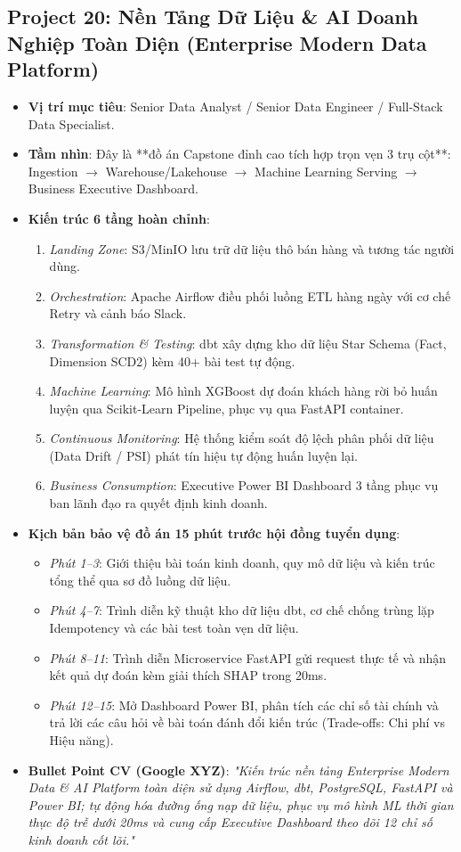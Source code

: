 \subsection{Project 20: Nền Tảng Dữ Liệu \& AI Doanh Nghiệp Toàn Diện (Enterprise Modern Data Platform)}
\begin{itemize}
    \item \textbf{Vị trí mục tiêu}: Senior Data Analyst / Senior Data Engineer / Full-Stack Data Specialist.
    \item \textbf{Tầm nhìn}: Đây là **đồ án Capstone đỉnh cao tích hợp trọn vẹn 3 trụ cột**: Ingestion $\rightarrow$ Warehouse/Lakehouse $\rightarrow$ Machine Learning Serving $\rightarrow$ Business Executive Dashboard.
    \item \textbf{Kiến trúc 6 tầng hoàn chỉnh}:
    \begin{enumerate}
        \item \textit{Landing Zone}: S3/MinIO lưu trữ dữ liệu thô bán hàng và tương tác người dùng.
        \item \textit{Orchestration}: Apache Airflow điều phối luồng ETL hàng ngày với cơ chế Retry và cảnh báo Slack.
        \item \textit{Transformation \& Testing}: dbt xây dựng kho dữ liệu Star Schema (Fact, Dimension SCD2) kèm 40+ bài test tự động.
        \item \textit{Machine Learning}: Mô hình XGBoost dự đoán khách hàng rời bỏ huấn luyện qua Scikit-Learn Pipeline, phục vụ qua FastAPI container.
        \item \textit{Continuous Monitoring}: Hệ thống kiểm soát độ lệch phân phối dữ liệu (Data Drift / PSI) phát tín hiệu tự động huấn luyện lại.
        \item \textit{Business Consumption}: Executive Power BI Dashboard 3 tầng phục vụ ban lãnh đạo ra quyết định kinh doanh.
    \end{enumerate}
    \item \textbf{Kịch bản bảo vệ đồ án 15 phút trước hội đồng tuyển dụng}:
    \begin{itemize}
        \item \textit{Phút 1--3}: Giới thiệu bài toán kinh doanh, quy mô dữ liệu và kiến trúc tổng thể qua sơ đồ luồng dữ liệu.
        \item \textit{Phút 4--7}: Trình diễn kỹ thuật kho dữ liệu dbt, cơ chế chống trùng lặp Idempotency và các bài test toàn vẹn dữ liệu.
        \item \textit{Phút 8--11}: Trình diễn Microservice FastAPI gửi request thực tế và nhận kết quả dự đoán kèm giải thích SHAP trong 20ms.
        \item \textit{Phút 12--15}: Mở Dashboard Power BI, phân tích các chỉ số tài chính và trả lời các câu hỏi về bài toán đánh đổi kiến trúc (Trade-offs: Chi phí vs Hiệu năng).
    \end{itemize}
    \item \textbf{Bullet Point CV (Google XYZ)}: \textit{"Kiến trúc nền tảng Enterprise Modern Data \& AI Platform toàn diện sử dụng Airflow, dbt, PostgreSQL, FastAPI và Power BI; tự động hóa đường ống nạp dữ liệu, phục vụ mô hình ML thời gian thực độ trễ dưới 20ms và cung cấp Executive Dashboard theo dõi 12 chỉ số kinh doanh cốt lõi."}
\end{itemize}
